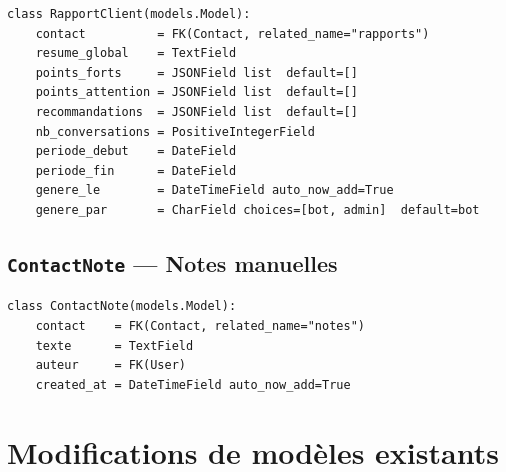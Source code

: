 \documentclass[11pt,a4paper]{article}
\newcommand{\slug}[1]{\texttt{\color{AGTDark}#1}}
\begin{document}
\begin{lstlisting}
class RapportClient(models.Model):
    contact          = FK(Contact, related_name="rapports")
    resume_global    = TextField
    points_forts     = JSONField list  default=[]
    points_attention = JSONField list  default=[]
    recommandations  = JSONField list  default=[]
    nb_conversations = PositiveIntegerField
    periode_debut    = DateField
    periode_fin      = DateField
    genere_le        = DateTimeField auto_now_add=True
    genere_par       = CharField choices=[bot, admin]  default=bot
\end{lstlisting}

\subsection{\slug{ContactNote} — Notes manuelles}

\begin{lstlisting}
class ContactNote(models.Model):
    contact    = FK(Contact, related_name="notes")
    texte      = TextField
    auteur     = FK(User)
    created_at = DateTimeField auto_now_add=True
\end{lstlisting}

\section{Modifications de modèles existants}
\end{document}
